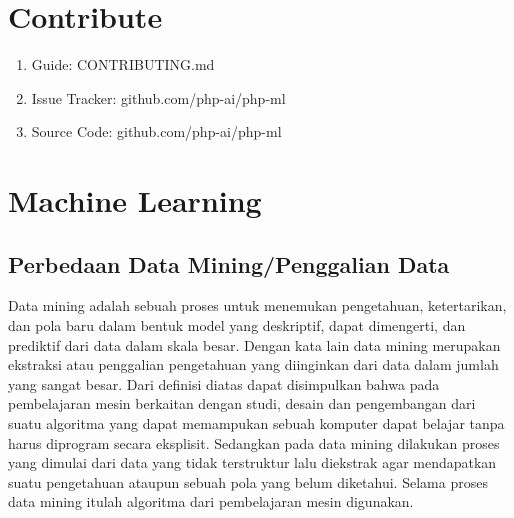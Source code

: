\section{Contribute}
\begin{enumerate}
\item Guide: CONTRIBUTING.md
\item Issue Tracker: github.com/php-ai/php-ml
\item Source Code: github.com/php-ai/php-ml
\end{enumerate}

\section{Machine Learning}

\subsection{Perbedaan Data Mining/Penggalian Data}
 Data mining adalah sebuah proses untuk menemukan pengetahuan, ketertarikan, dan pola baru dalam bentuk model yang deskriptif, dapat dimengerti, dan prediktif dari data dalam skala besar. Dengan kata lain data mining merupakan ekstraksi atau penggalian pengetahuan yang diinginkan dari data dalam jumlah yang sangat besar.
Dari definisi diatas dapat disimpulkan bahwa pada pembelajaran mesin berkaitan dengan studi, desain dan pengembangan dari suatu algoritma yang dapat memampukan sebuah komputer dapat belajar tanpa harus diprogram secara eksplisit. Sedangkan pada data mining dilakukan proses yang dimulai dari data yang tidak terstruktur lalu diekstrak agar mendapatkan suatu pengetahuan ataupun sebuah pola yang belum diketahui. Selama proses data mining itulah algoritma dari pembelajaran mesin digunakan.


